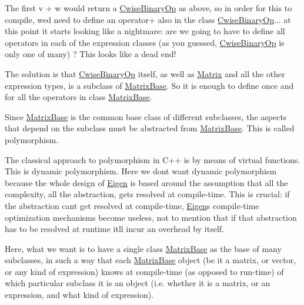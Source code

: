 The first v + w would return a \hyperlink{group___core___module_class_eigen_1_1_cwise_binary_op}{Cwise\+Binary\+Op} as above, so in order for this to compile, we\textquotesingle{}d need to define an operator+ also in the class \hyperlink{group___core___module_class_eigen_1_1_cwise_binary_op}{Cwise\+Binary\+Op}... at this point it starts looking like a nightmare\+: are we going to have to define all operators in each of the expression classes (as you guessed, \hyperlink{group___core___module_class_eigen_1_1_cwise_binary_op}{Cwise\+Binary\+Op} is only one of many) ? This looks like a dead end!

The solution is that \hyperlink{group___core___module_class_eigen_1_1_cwise_binary_op}{Cwise\+Binary\+Op} itself, as well as \hyperlink{group___core___module_class_eigen_1_1_matrix}{Matrix} and all the other expression types, is a subclass of \hyperlink{group___core___module_class_eigen_1_1_matrix_base}{Matrix\+Base}. So it is enough to define once and for all the operators in class \hyperlink{group___core___module_class_eigen_1_1_matrix_base}{Matrix\+Base}.

Since \hyperlink{group___core___module_class_eigen_1_1_matrix_base}{Matrix\+Base} is the common base class of different subclasses, the aspects that depend on the subclass must be abstracted from \hyperlink{group___core___module_class_eigen_1_1_matrix_base}{Matrix\+Base}. This is called polymorphism.

The classical approach to polymorphism in C++ is by means of virtual functions. This is dynamic polymorphism. Here we don\textquotesingle{}t want dynamic polymorphism because the whole design of \hyperlink{namespace_eigen}{Eigen} is based around the assumption that all the complexity, all the abstraction, gets resolved at compile-\/time. This is crucial\+: if the abstraction can\textquotesingle{}t get resolved at compile-\/time, \hyperlink{namespace_eigen}{Eigen}\textquotesingle{}s compile-\/time optimization mechanisms become useless, not to mention that if that abstraction has to be resolved at runtime it\textquotesingle{}ll incur an overhead by itself.

Here, what we want is to have a single class \hyperlink{group___core___module_class_eigen_1_1_matrix_base}{Matrix\+Base} as the base of many subclasses, in such a way that each \hyperlink{group___core___module_class_eigen_1_1_matrix_base}{Matrix\+Base} object (be it a matrix, or vector, or any kind of expression) knows at compile-\/time (as opposed to run-\/time) of which particular subclass it is an object (i.\+e. whether it is a matrix, or an expression, and what kind of expression).

